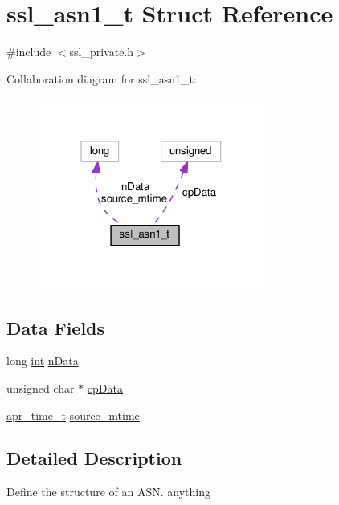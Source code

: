 \hypertarget{structssl__asn1__t}{}\section{ssl\+\_\+asn1\+\_\+t Struct Reference}
\label{structssl__asn1__t}


{\ttfamily \#include $<$ssl\+\_\+private.\+h$>$}



Collaboration diagram for ssl\+\_\+asn1\+\_\+t\+:
\nopagebreak
\begin{figure}[H]
\begin{center}
\leavevmode
\includegraphics[width=211pt]{structssl__asn1__t__coll__graph}
\end{center}
\end{figure}
\subsection*{Data Fields}
\begin{DoxyCompactItemize}
\item 
long \hyperlink{pcre_8txt_a42dfa4ff673c82d8efe7144098fbc198}{int} \hyperlink{structssl__asn1__t_ab6aba132c3ebc21c380618c9d49f6ebe}{n\+Data}
\item 
unsigned char $\ast$ \hyperlink{structssl__asn1__t_afa73bf65f652bd8d4bbc5e2a63353877}{cp\+Data}
\item 
\hyperlink{group__apr__time_gadb4bde16055748190eae190c55aa02bb}{apr\+\_\+time\+\_\+t} \hyperlink{structssl__asn1__t_aae73a4b4725a985d1cdc4dbb8da0a049}{source\+\_\+mtime}
\end{DoxyCompactItemize}


\subsection{Detailed Description}
Define the structure of an A\+S\+N. anything 

